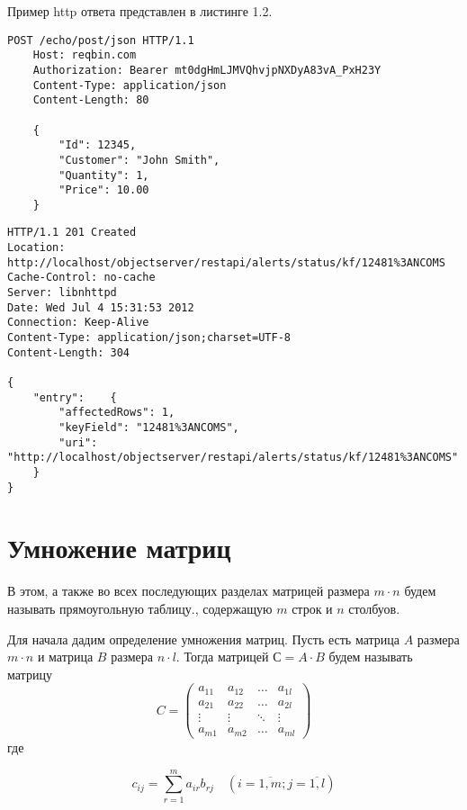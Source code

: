 Пример http ответа представлен в листинге 1.2.

\begin{lstlisting}[caption=Пример http запроса]
	POST /echo/post/json HTTP/1.1
	Host: reqbin.com
	Authorization: Bearer mt0dgHmLJMVQhvjpNXDyA83vA_PxH23Y
	Content-Type: application/json
	Content-Length: 80
	
	{
		"Id": 12345,
		"Customer": "John Smith",
		"Quantity": 1,
		"Price": 10.00
	}
\end{lstlisting}

\pagebreak

\begin{lstlisting}[caption=Пример http ответа]
HTTP/1.1 201 Created
Location: http://localhost/objectserver/restapi/alerts/status/kf/12481%3ANCOMS
Cache-Control: no-cache
Server: libnhttpd
Date: Wed Jul 4 15:31:53 2012
Connection: Keep-Alive
Content-Type: application/json;charset=UTF-8
Content-Length: 304

{
	"entry":	{
		"affectedRows": 1,
		"keyField": "12481%3ANCOMS",
		"uri": "http://localhost/objectserver/restapi/alerts/status/kf/12481%3ANCOMS"
	}
}
\end{lstlisting}

\section{Умножение матриц}

В этом, а также во всех последующих разделах матрицей размера $m \cdot n$ будем называть прямоугольную таблицу., содержащую $m$ строк и $n$ столбуов.

Для начала дадим определение умножения матриц. Пусть есть матрица $A$ размера  $m \cdot n$ и матрица $B$ размера $n \cdot l$. Тогда матрицей $С = A \cdot B$ будем называть матрицу 
\begin{equation}
	C = \begin{pmatrix}
		a_{11} & a_{12} & \ldots & a_{1l}\\
		a_{21} & a_{22} & \ldots & a_{2l}\\
		\vdots & \vdots & \ddots & \vdots\\
		a_{m1} & a_{m2} & \ldots & a_{ml}
	\end{pmatrix}
\end{equation}
где

\begin{equation}
	\label{eq:mult}
	c_{ij} = \sum_{r=1}^{m} a_{ir}b_{rj} \quad (i=\overline{1,m}; j=\overline{1,l})
\end{equation}


